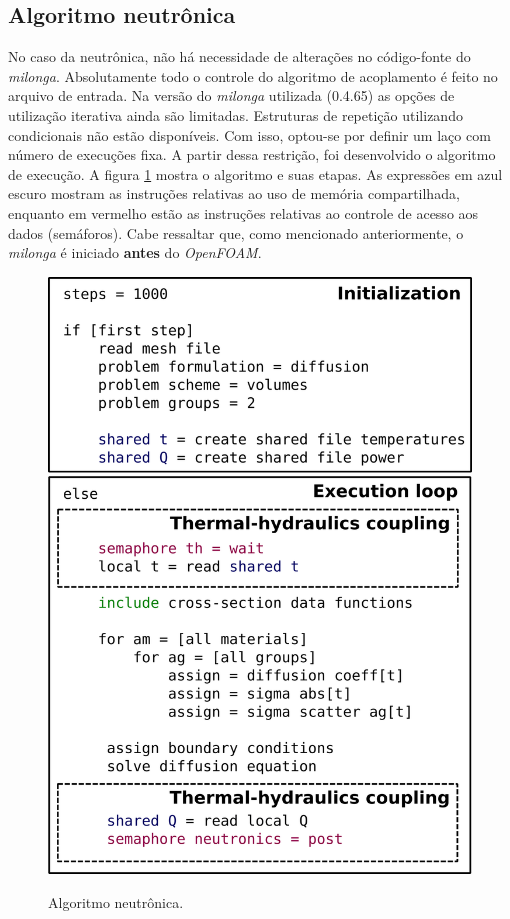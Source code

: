 \subsection{Algoritmo neutrônica}

No caso da neutrônica, não há necessidade de alterações no código-fonte do \textit{milonga}. Absolutamente
todo o controle do algoritmo de acoplamento é feito no arquivo de entrada. Na versão do
\textit{milonga} utilizada (0.4.65) as opções de utilização iterativa ainda são limitadas. Estruturas
de repetição utilizando condicionais não estão disponíveis. Com isso, optou-se por definir um laço com número
de execuções fixa. A partir dessa restrição, foi desenvolvido o algoritmo de execução. A figura
\ref{fig:algo_neutronica} mostra o algoritmo e suas etapas. As expressões em azul escuro mostram as instruções
relativas ao uso de memória compartilhada, enquanto em vermelho estão
as instruções relativas ao controle de acesso aos dados (semáforos). Cabe ressaltar que,
como mencionado anteriormente,
o \textit{milonga} é iniciado \textbf{antes} do \textit{OpenFOAM}.

\begin{figure}[htb]
  \caption{Algoritmo neutrônica.}
  \centering\includegraphics[scale=0.5]{figuras/algoritmos_milonga.png}
  \label{fig:algo_neutronica}
\end{figure}

